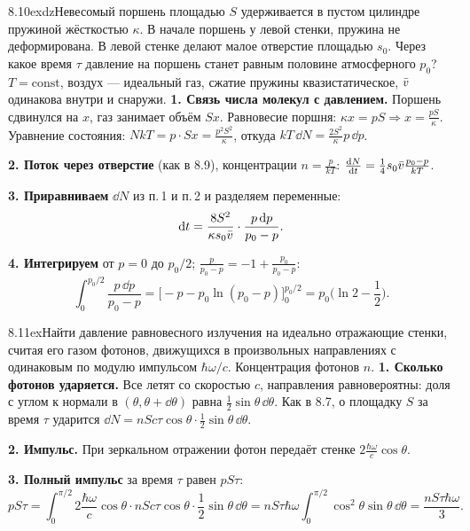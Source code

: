 \begin{problem}{8.10}{exdz}{Невесомый поршень площадью $S$ удерживается в пустом цилиндре пружиной жёсткостью $\kappa$. В начале поршень у левой стенки,
пружина не деформирована. В левой стенке делают малое отверстие площадью $s_0$. Через какое время $\tau$ давление на поршень станет
равным половине атмосферного $p_0$? $T=\text{const}$, воздух — идеальный газ, сжатие пружины квазистатическое, $\bar v$ одинакова внутри и снаружи.}
\textbf{1. Связь числа молекул с давлением.} Поршень сдвинулся на $x$, газ занимает объём $Sx$. Равновесие поршня: $\kappa x=pS\Rightarrow x=\frac{pS}{\kappa}$.
Уравнение состояния: $NkT=p\cdot Sx=\frac{p^2S^2}{\kappa}$, откуда $kT\,\dd N=\frac{2S^2}{\kappa}p\,\dd p$.

\textbf{2. Поток через отверстие} (как в 8.9), концентрации $n=\frac p{kT}$:
$\frac{\mathrm{d} N}{\mathrm{d} t}=\frac14s_0\bar v\frac{p_0-p}{kT}$.

\textbf{3. Приравниваем} $\dd N$ из п.\,1 и п.\,2 и разделяем переменные:
\[\mathrm{d} t=\frac{8S^2}{\kappa s_0\bar v}\cdot\frac{p\,\mathrm{d} p}{p_0-p}.\]

\textbf{4. Интегрируем} от $p=0$ до $p_0/2$; $\frac{p}{p_0-p}=-1+\frac{p_0}{p_0-p}$:
\[\int_0^{p_0/2}\frac{p\,\dd p}{p_0-p}=\Big[-p-p_0\ln(p_0-p)\Big]_0^{p_0/2}=p_0\Big(\ln2-\frac12\Big).\]
\end{problem}

\begin{problem}{8.11}{ex}{Найти давление равновесного излучения на идеально отражающие стенки, считая его газом фотонов, движущихся в произвольных
направлениях с одинаковым по модулю импульсом $\hbar\omega/c$. Концентрация фотонов $n$.}
\textbf{1. Сколько фотонов ударяется.} Все летят со скоростью $c$, направления равновероятны: доля с углом к нормали в $(\theta,\theta+\dd\theta)$
равна $\frac12\sin\theta\,\dd\theta$. Как в 8.7, о площадку $S$ за время $\tau$ ударится $\dd N=nSc\tau\cos\theta\cdot\frac12\sin\theta\,\dd\theta$.

\textbf{2. Импульс.} При зеркальном отражении фотон передаёт стенке $2\frac{\hbar\omega}{c}\cos\theta$.

\textbf{3. Полный импульс} за время $\tau$ равен $pS\tau$:
\[pS\tau=\int_0^{\pi/2}2\frac{\hbar\omega}{c}\cos\theta\cdot nSc\tau\cos\theta\cdot\frac12\sin\theta\,\dd\theta
=nS\tau\hbar\omega\int_0^{\pi/2}\cos^2\theta\sin\theta\,\dd\theta=\frac{nS\tau\hbar\omega}{3}.\]
\end{problem}

